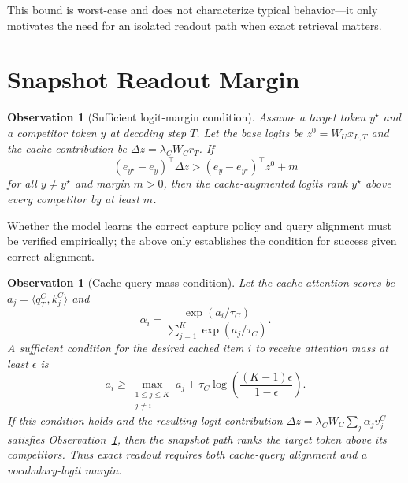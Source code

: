 \documentclass[preprint,12pt]{elsarticle}
\newtheorem{observation}[theorem]{Observation}
\begin{document}
This bound is worst-case and does not characterize typical behavior---it only motivates the need for an isolated readout path when exact retrieval matters.

\section{Snapshot Readout Margin}
\label{app:snapshot}

\begin{observation}[Sufficient logit-margin condition]\label{prop:logit-margin}
Assume a target token $y^\star$ and a competitor token $y$ at decoding step $T$. Let the base logits be $z^0=W_Ux_{L,T}$ and the cache contribution be $\Delta z=\lambda_C W_C r_T$. If
\begin{equation}
\label{eq:logit-margin}
(e_{y^\star}-e_y)^\top \Delta z
>
(e_y-e_{y^\star})^\top z^0 + m
\end{equation}
for all $y\neq y^\star$ and margin $m>0$, then the cache-augmented logits rank $y^\star$ above every competitor by at least $m$.
\end{observation}



Whether the model learns the correct capture policy and query alignment must be verified empirically; the above only establishes the condition for success given correct alignment.

\begin{observation}[Cache-query mass condition]
\label{prop:cache-mass}
Let the cache attention scores be $a_j=\langle q_T^C,k_j^C\rangle$ and
\begin{equation}
\alpha_i=\frac{\exp(a_i/\tau_C)}{\sum_{j=1}^{K}\exp(a_j/\tau_C)}.
\end{equation}
A sufficient condition for the desired cached item $i$ to receive attention mass at least $\epsilon$ is
\begin{equation}
\label{eq:cache-mass-margin}
a_i\geq \max_{\substack{1\le j\le K\\ j\ne i}}a_j+\tau_C\log\left(\frac{(K-1)\epsilon}{1-\epsilon}\right).
\end{equation}
If this condition holds and the resulting logit contribution $\Delta z=\lambda_CW_C\sum_j\alpha_jv_j^C$ satisfies Observation~\ref{prop:logit-margin}, then the snapshot path ranks the target token above its competitors. Thus exact readout requires both cache-query alignment and a vocabulary-logit margin.
\end{observation}
\end{document}
